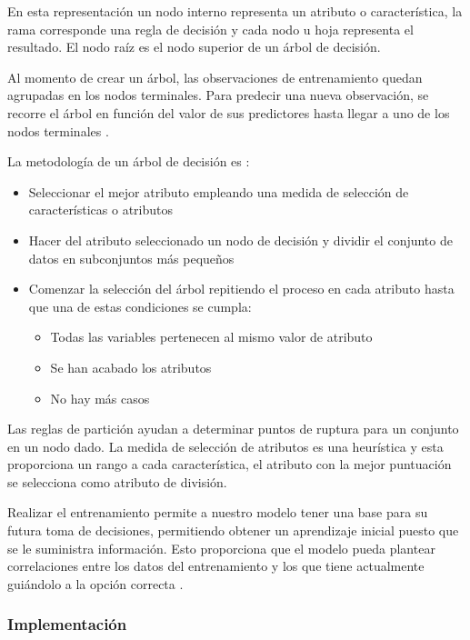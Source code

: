 \documentclass[journal]{IEEEtran}                                                          %
\begin{document}
            En esta representación un nodo interno representa un atributo o característica, la rama corresponde una regla de decisión y cada nodo u hoja representa el resultado. El nodo raíz es el nodo superior de un árbol de decisión.

            Al momento de crear un árbol, las observaciones de entrenamiento quedan agrupadas en los nodos terminales. Para predecir una nueva observación, se recorre el árbol en función del valor de sus predictores hasta llegar a uno de los nodos terminales \cite{rodrigo-2020}.

            La metodología de un árbol de decisión es \cite{gonzalez-2020}:
            \begin{itemize}
                \item Seleccionar el mejor atributo empleando una medida de selección de características o atributos
                \item Hacer del atributo seleccionado un nodo de decisión y dividir el conjunto de datos en subconjuntos más pequeños
                \item Comenzar la selección del árbol repitiendo el proceso en cada atributo hasta que una de estas condiciones se cumpla: \begin{itemize}
                    \item Todas las variables pertenecen al mismo valor de atributo
                    \item Se han acabado los atributos
                    \item No hay más casos
                \end{itemize}
            \end{itemize}

            Las reglas de partición ayudan a determinar puntos de ruptura para un conjunto en un nodo dado. La medida de selección de atributos es una heurística y esta proporciona un rango a cada característica, el atributo con la mejor puntuación se selecciona como atributo de división.

            Realizar el entrenamiento permite a nuestro modelo tener una base para su futura toma de decisiones, permitiendo obtener un aprendizaje inicial puesto que se le suministra información. Esto proporciona que el modelo pueda plantear correlaciones entre los datos del entrenamiento y los que tiene actualmente guiándolo a la opción correcta \cite{agencia-b12_2021}.

            \subsubsection{Implementación}
\end{document}
